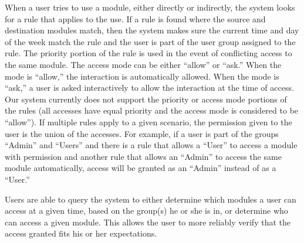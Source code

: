 When a user tries to use a module, either directly or indirectly, the system
looks for a rule that applies to the use. If a rule is found where the source
and destination modules match, then the system makes sure the current time and
day of the week match the rule and the user is part of the user group assigned
to the rule. The priority portion of the rule is used in the event of
conflicting access to the same module. The access mode can be either ``allow''
or ``ask.'' When the mode is ``allow,'' the interaction is automatically
allowed. When the mode is ``ask,'' a user is asked interactively to allow the
interaction at the time of access. Our system currently does not support the
priority or access mode portions of the rules (all accesses have equal priority
and the access mode is considered to be ``allow''). If multiple rules apply to a
given scenario, the permission given to the user is the union of the accesses.
For example, if a user is part of the groups ``Admin'' and ``Users'' and there
is a rule that allows a ``User'' to access a module with permission and another
rule that allows an ``Admin'' to access the same module automatically, access
will be granted as an ``Admin'' instead of as a ``User.''

Users are able to query the system to either determine which modules a user can
access at a given time, based on the group(s) he or she is in, or determine who
can access a given module. This allows the user to more reliably verify that the
access granted fits his or her expectations.
